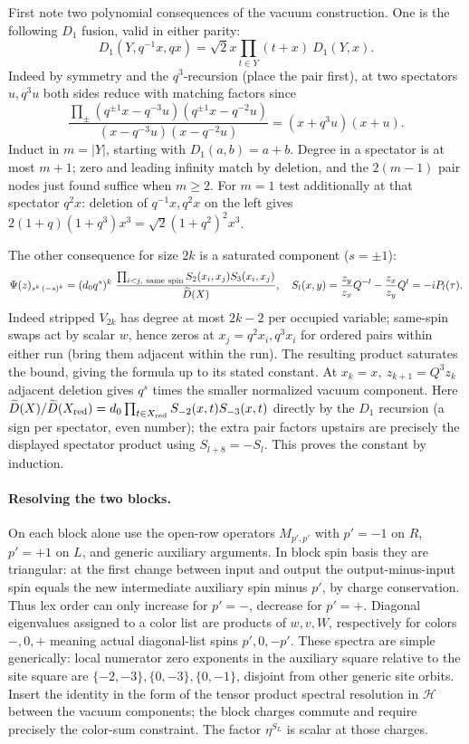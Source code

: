 First note two polynomial consequences of the vacuum construction. One is the following \(D_1\) fusion, valid in either parity:
\begin{equation}
      D_1(Y,q^{-1}x,qx)=\sqrt2 x\prod_{t\in Y}(t+x)\ D_1(Y,x).
                                                                    \label{c4:D1-fusion}
\end{equation}
Indeed by symmetry and the \(q^3\)-recursion (place the pair first), at two spectators \(u,q^3u\) both sides reduce with matching factors since
\[
 \frac{\prod_{\pm}(q^{\pm1}x-q^{-3}u)(q^{\pm1}x-q^{-2}u)}
             {(x-q^{-3}u)(x-q^{-2}u)}=(x+q^3u)(x+u).
\]
Induct in \(m=|Y|\), starting with \(D_1(a,b)=a+b\). Degree in a spectator is at most \(m+1\); zero and leading infinity match by deletion, and the \(2(m-1)\) pair nodes just found suffice when \(m\ge2\). For \(m=1\) test additionally at that spectator \(q^2x\): deletion of \(q^{-1}x,q^2x\) on the left gives \(2(1+q)(1+q^3)x^3=\sqrt2(1+q^2)^2x^3\).

The other consequence for size \(2k\) is a saturated component (\(s=\pm1\)):
\[
 \Psi(z)_{s^k\,(-s)^k}
     =(d_0 q^s)^k \ \frac{\prod_{i<j,\ {\rm same\ spin}}S_2(x_i,x_j)S_3(x_i,x_j)}
                                    {\widetilde D(X)},\quad
 S_l(x,y)=\frac{z_y}{z_x}Q^{-l}-\frac{z_x}{z_y}Q^l=-iP_l(\tau).
\]
Indeed stripped \(V_{2k}\) has degree at most \(2k-2\) per occupied variable; same-spin swaps act by scalar \(w\), hence zeros at \(x_j=q^2x_i,q^3x_i\) for ordered pairs within either run (bring them adjacent within the run). The resulting product saturates the bound, giving the formula up to its stated constant. At \(x_k=x,\ z_{k+1}=Q^3 z_k\) adjacent deletion gives \(q^s\) times the smaller normalized vacuum component. Here \(\widetilde D(X)/\widetilde D(X_{\rm red})=d_0\prod_{t\in X_{\rm red}}S_{-2}(x,t)S_{-3}(x,t)\) directly by the \(D_1\) recursion (a sign per spectator, even number); the extra pair factors upstairs are precisely the displayed spectator product using \(S_{l+8}=-S_l\). This proves the constant by induction.

\paragraph{Resolving the two blocks.} On each block alone use the open-row operators \(M_{p',p'}\) with \(p'=-1\) on \(R\), \(p'=+1\) on \(L\), and generic auxiliary arguments. In block spin basis they are triangular: at the first change between input and output the output-minus-input spin equals the new intermediate auxiliary spin minus \(p'\), by charge conservation. Thus lex order can only increase for \(p'=-\), decrease for \(p'=+\). Diagonal eigenvalues assigned to a color list are products of \(w,v,W\), respectively for colors \(-,0,+\) meaning actual diagonal-list spins \(p',0,-p'\). These spectra are simple generically: local numerator zero exponents in the auxiliary square relative to the site square are \(\{-2,-3\},\{0,-3\},\{0,-1\}\), disjoint from other generic site orbits. Insert the identity in the form of the tensor product spectral resolution in \(\mathscr H\) between the vacuum components; the block charges commute and require precisely the color-sum constraint. The factor \(\eta^{S_L}\) is scalar at those charges.

